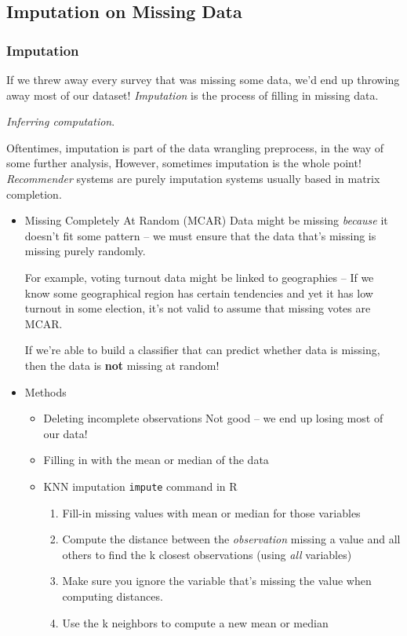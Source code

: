 \documentclass[11pt]{article}
\begin{document}
\begin{itemize}
\subsection{Imputation on Missing Data}
\label{sec-4-3}

\subsubsection*{Imputation}
\label{sec-4-3-1}
If we threw away every survey that was missing some data, we'd end up throwing away most of our dataset! \emph{Imputation} is the process of filling in missing data.

\emph{Inferring computation}.

Oftentimes, imputation is part of the data wrangling preprocess, in the way of some further analysis, However, sometimes imputation is the whole point! \emph{Recommender} systems are purely imputation systems usually based in matrix completion.

\begin{itemize}
\item Missing Completely At Random (MCAR)
\label{sec-4-3-1-1}
Data might be missing \emph{because} it doesn't fit some pattern -- we must ensure that the data that's missing is missing purely randomly.

For example, voting turnout data might be linked to geographies -- If we know some geographical region has certain tendencies and yet it has low turnout in some election, it's not valid to assume that missing votes are MCAR.

If we're able to build a classifier that can predict whether data is missing, then the data is \textbf{not} missing at random!

\item Methods
\label{sec-4-3-1-2}
\begin{itemize}
\item Deleting incomplete observations
\label{sec-4-3-1-2-1}
Not good -- we end up losing most of our data!
\item Filling in with the mean or median of the data
\label{sec-4-3-1-2-2}

\item KNN imputation
\label{sec-4-3-1-2-3}
\texttt{impute} command in R

\begin{enumerate}
\item Fill-in missing values with mean or median for those variables
\item Compute the distance between the \emph{observation} missing a value and all others to find the k closest observations (using \emph{all} variables)
\item Make sure you ignore the variable that's missing the value when computing distances.
\item Use the k neighbors to compute a new mean or median
\end{enumerate}


\end{itemize}
\end{itemize}
\end{itemize}
\end{document}
